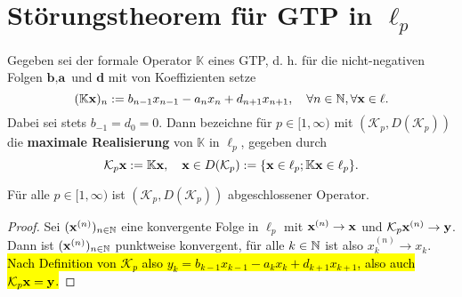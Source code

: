 

\section{Störungstheorem für GTP in $\ell_p$}

\begin{konstr}
Gegeben sei der formale Operator  $\mathbb  K$ eines GTP, d. h. für die nicht-negativen Folgen $\textbf{b},\textbf{a}$ und $\textbf{d}$ mit von Koeffizienten setze
\begin{equation*}
(\mathbb K\textnormal{\textbf{x}})_n:=b_{n-1}x_{n-1} -a_nx_n + d_{n+1}x_{n+1},\quad \forall n\in\mathbb{N},\forall\textbf{x}\in \ell.
\end{equation*}
Dabei sei stets $b_{-1}=d_0=0$. Dann bezeichne für $p\in[1,\infty)$ mit $(\mathcal K_p, D(\mathcal K_p))$ die \textbf{maximale Realisierung} von $\mathbb K$ in $\ell_p$, gegeben durch
\begin{equation*}
\mathcal K_p\textnormal{\textbf{x}}:= \mathbb K\textnormal{\textbf{x}},\quad \textbf{x}\in D(\mathcal K_p):=\{\textnormal{\textbf{x}}\in \ell_p; \mathbb K\textnormal{\textbf{x}} \in \ell_p\}.
\end{equation*}
\end{konstr}

\begin{prop}\label{Abgeschlossenheit des maximalen Operators K_p}
Für alle $p\in[1,\infty)$ ist $(\mathcal K_p, D(\mathcal K_p))$ abgeschlossener Operator.
\end{prop}

\begin{proof}
Sei $(\textnormal{\textbf{x}}^{(n)})_{n\in\mathbb{N}}$ eine konvergente Folge in $\ell_p$ mit $\textnormal{\textbf{x}}^{(n)}\to \textnormal{\textbf{x}}$ und $\mathcal  K_p\textnormal{\textbf{x}}^{(n)}\to\textnormal{\index{}\textbf y}$. Dann ist $(\textnormal{\textbf{x}}^{(n)})_{n\in\mathbb{N}}$ punktweise konvergent, für alle $k\in\mathbb{N}$ ist also $x_k^{(n)}\to x_k$. \hl{Nach Definition von $\mathcal  K_p$ also $y_k = b_{k-1}x_{k-1} -a_k x_k + d_{k+1} x_{k+1}$, also auch $\mathcal  K_p\textnormal{\textbf{x}} = \textnormal{\index{}\textbf y}$.}
\end{proof}



